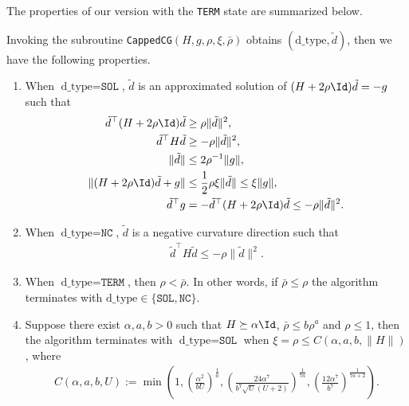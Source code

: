 The properties of our version with the \texttt{TERM} state are summarized below.
\begin{lemma}
    \label{lem:capped-cg}
    Invoking the subroutine \texttt{CappedCG}$(H, g, \rho, \xi, \bar\rho)$ obtains $(\text{d\_type}, \tilde d)$, then we have the following properties.
    \begin{enumerate}
        \item When $\text{d\_type} = \texttt{SOL}$, $\tilde d$ is an approximated solution of $(H + 2\rho \Id)\tilde d=-g$ such that
    \begin{align}
        \label{eqn:capped-cg-hessian-lowerbound}
        \tilde d^\top (H + 2\rho \Id) \tilde d &\geq\rho \|  \tilde d\|^2,  \\
        \label{eqn:capped-cg-hessian-lowerbound-H}
        \tilde d^\top H \tilde d &\geq -\rho \|  \tilde d\|^2, 
        \\
        \label{eqn:capped-cg-io-diff}
        \| \tilde d \| &\leq 2 \rho^{-1} \|g\|, \\
        \label{eqn:capped-cg-hessian-upperbound}
        \| (H + 2\rho \Id) \tilde d + g \| &\leq \frac{1}{2}\rho \xi \|\tilde d\| \leq \xi \|g\|,\\
        \label{eqn:capped-cg-descent-direction}
        \tilde d^\top g &= - \tilde d^\top (H + 2\rho \Id) \tilde d \leq -\rho \|\tilde d \|^2.
    \end{align}
        \item When $\text{d\_type} = \texttt{NC}$, $\tilde d$ is a negative curvature direction such that 
    \begin{align}
        \tilde d^\top H\tilde d \leq -\rho\|\tilde d\|^2.
        \label{eqn:capped-cg-nc-direction-inequ}
    \end{align}
        \item When $\text{d\_type} = \texttt{TERM}$, then $\rho < \bar \rho$.
        In other words, if $\bar\rho \leq \rho$ the algorithm terminates with $\text{d\_type} \in \{\texttt{SOL}, \texttt{NC}\}$.
    \item 
    Suppose there exist $\alpha, a, b > 0$ such that
     $H \succeq \alpha \Id$, $\bar \rho \leq b\rho^a$ and $\rho \leq 1$, then 
     the algorithm terminates with $\text{d\_type} = \texttt{SOL}$ when $\xi = \rho \leq C(\alpha, a, b, \|H\|)$, where
     \begin{align*}
        C(\alpha, a, b, U) := 
        \min\left( 1,
            \left (\frac{\alpha^2}{b U} \right )^{\frac{1}{a}}, 
            \left( \frac{24\alpha^7}{b^7 \sqrt{U}(U+2)} \right)^{\frac{1}{7a}},
            \left( \frac{12\alpha^7}{b^7} \right)^{\frac{1}{7a+2}}
         \right).
     \end{align*}
    \end{enumerate}
\end{lemma}
